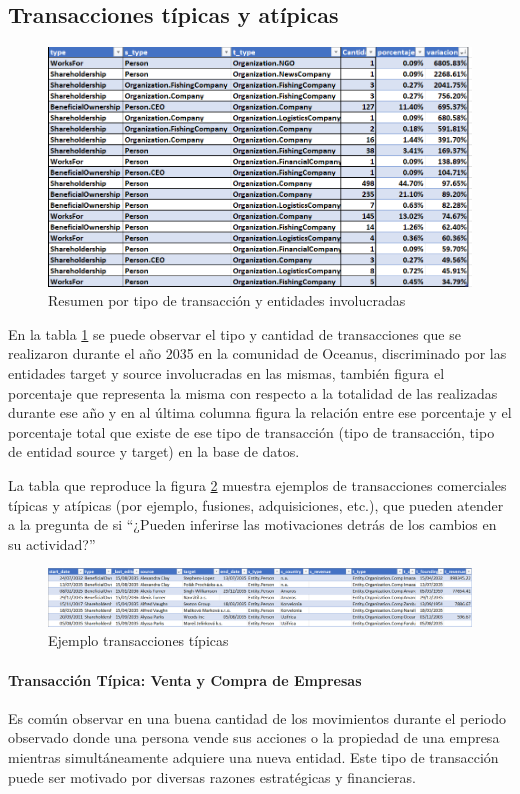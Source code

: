\documentclass[11pt,spanish,a4paper]{article}
\begin{document}
\subsection{Transacciones típicas y atípicas}

\begin{figure}[H]
    \centering
    \includegraphics[width=0.7\linewidth]{graphs/ejercicio_2_0_.png}
    \caption{Resumen por tipo de transacción y entidades involucradas}
    \label{fig:enter-label3}
\end{figure}

En la tabla \ref{fig:enter-label3} se puede observar el tipo y cantidad de transacciones que se realizaron durante el año 2035 en la comunidad de Oceanus, discriminado por las entidades target y source involucradas en las mismas, también figura el porcentaje que representa la misma con respecto a la totalidad de las realizadas durante ese año y en al última columna figura la relación entre ese porcentaje y el porcentaje total que existe de ese tipo de transacción (tipo de transacción, tipo de entidad source y target) en la base de datos.

La tabla que reproduce la figura \ref{fig:enter-label4} muestra ejemplos de transacciones comerciales típicas y atípicas (por ejemplo, fusiones, adquisiciones, etc.), que pueden atender a la pregunta de si ``¿Pueden inferirse las motivaciones detrás de los cambios en su actividad?''

\begin{figure}[H]
    \centering
    \includegraphics[width=1\linewidth]{graphs/ejercicio_2_1.png}
    \caption{Ejemplo transacciones típicas}
    \label{fig:enter-label4}
\end{figure}


\paragraph{Transacción Típica: Venta y Compra de Empresas}
Es común observar en una buena cantidad de los movimientos durante el periodo observado donde una persona vende sus acciones o la propiedad de una empresa mientras simultáneamente adquiere una nueva entidad. Este tipo de transacción puede ser motivado por diversas razones estratégicas y financieras.
\end{document}
